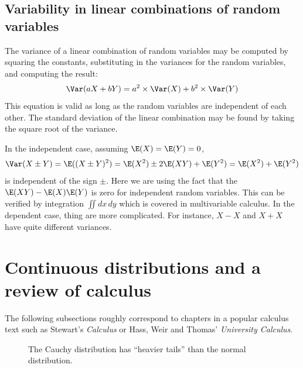 \subsection{Variability in linear combinations of random variables}


\begin{termBox}{
The variance of a linear combination of random variables may be computed by squaring the constants, substituting in the variances for the random variables, and computing the result:
\begin{align*}
\Var(aX + bY) = a^2\times \Var(X) + b^2\times \Var(Y)
\end{align*}
This equation is valid as long as the random variables are independent of each other. The standard deviation of the linear combination may be found by taking the square root of the variance.}
\end{termBox}

In the independent case, assuming $\E(X)=\E(Y)=0$,
\[
	\Var(X\pm Y) = \E((X\pm Y)^2) = \E(X^2) \pm 2 \E(XY) + \E(Y^2) = \E(X^2)+\E(Y^2)
\]
is independent of the sign $\pm$. Here we are using the fact that the  $\E(XY)-\E(X)\E(Y)$ is zero for independent random variables. This can be verified by integration $\iint dx\,dy$ which is covered in multivariable calculus.
In the dependent case, thing are more complicated. For instance, $X-X$ and $X+X$ have quite different variances.


\section{Continuous distributions and a review of calculus}
\label{contDist}


The following subsections roughly correspond to chapters in a popular calculus text such as Stewart's \emph{Calculus} or Hass, Weir and Thomas' \emph{University Calculus}.

\begin{figure}
\caption{The Cauchy distribution has ``heavier tails'' than the normal distribution.}
\end{figure}

